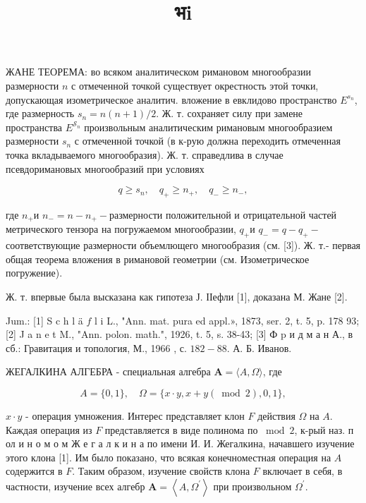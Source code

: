 \documentclass[10pt]{article}
\title{भi }
\author{}
\date{}
\begin{document}
\maketitle

ЖАНЕ ТЕОРЕМА: во всяком аналитическом римановом многообразии размерности $n$ с отмеченной точкой существует окрестность этой точки, допускающая изометрическое аналитич. вложение в евклидово пространство $E^{s_{n}}$, где размерность $s_{n}=n(n+1) / 2$. Ж. т. сохраняет силу при замене пространства $E^{\mathcal{S}_{n}}$ произвольным аналитическим римановым многообразием размерности $s_{n}$ с отмеченной точкой (в к-рую должна переходить отмеченная точка вкладываемого многообразия). Ж. т. справедлива в случае псевдоримановых многообразий при условиях



\[

q \geqslant s_{n}, \quad q_{+} \geqslant n_{+}, \quad q_{-} \geqslant n_{-},

\]



где $n_{+}$и $n_{-}=n-n_{+}-$размерности положительной и отрицательной частей метрического тензора на погружаемом многообразии, $q_{+}$и $q_{-}=q-q_{+}-$соответствующие размерности объемлющего многообразия (см. [3]). Ж. т.- первая общая теорема вложения в римановой геометрии (см. Изометрическое погружение).



Ж. т. впервые была высказана как гипотеза Ј. ІІефли [1], доказана М. Жане [2].



Jum.: [1] S c h l ä $f$ l i L., "Ann. mat. pura ed appl.», 1873, ser. 2, t. 5, p. 178 93; [2] J a n e t M., "Ann. polon. math.", 1926, t. 5, s. 38-43; [3] Ф p и д м а н А., в сб.: Гравитация и топология, М., 1966 , с. $182-88$. А. Б. Иванов.



ЖЕГАЛКИНА АЛГЕБРА - специальная алгебра $\boldsymbol{A}=\langle A, \Omega\rangle$, где



\[

A=\{0,1\}, \quad \Omega=\{x \cdot y, x+y(\bmod 2), 0,1\},

\]



$x \cdot y$ - операция умножения. Интерес представляет клон $F$ действия $\Omega$ на $A$. Каждая операция из $F$ представляется в виде полинома по $\bmod 2$, к-рый наз. п ол и н о м о м Ж е г а л к и н а по имени И. И. Жегалкина, начавшего изучение этого клона [1]. Им было показано, что всякая конечноместная операция на $A$ содержится в $F$. Таким образом, изучение свойств клона $F$ включает в себя, в частности, изучение всех алгебр $\boldsymbol{A}=\left\langle A, \Omega^{\prime}\right\rangle$ при произвольном $\Omega^{\prime}$.
\end{document}
